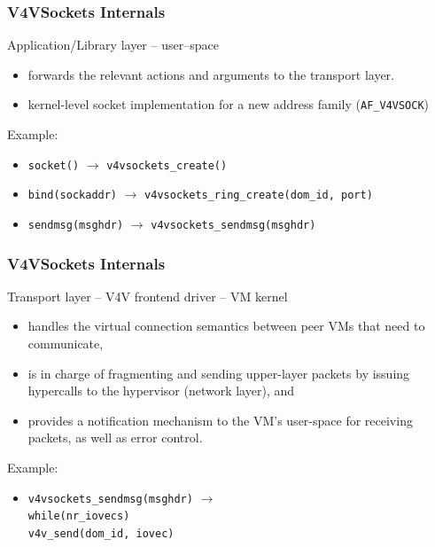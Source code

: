 \documentclass[red,slidestop,notes,compress,mathserif]{beamer}
\begin{document}
\begin{frame}
\frametitle{V4VSockets Internals}
\begin{block}{Application/Library layer -- user--space}
\begin{itemize}
\item forwards the relevant actions and arguments to the transport layer.
\item kernel-level socket implementation for a new address family (\texttt{AF\_V4VSOCK})
\end{itemize}
\end{block}
\begin{block}{Example:}
\begin{itemize}
\item \texttt{socket()} $\rightarrow$ \texttt{v4vsockets\_create()}
\item \texttt{bind(sockaddr)} $\rightarrow$ \texttt{v4vsockets\_ring\_create(dom\_id, port)}
\item \texttt{sendmsg(msghdr)} $\rightarrow$ \texttt{v4vsockets\_sendmsg(msghdr)}
\end{itemize}
\end{block}
\end{frame}

\begin{frame}
\frametitle{V4VSockets Internals}
\begin{block}{Transport layer -- V4V frontend driver -- VM kernel}
\begin{itemize}
\item handles the virtual connection semantics between peer VMs that need to communicate,
\item is in charge of fragmenting and sending upper-layer packets by issuing hypercalls to the hypervisor (network layer), and
\item provides a notification mechanism to the VM's user-space for receiving packets, as well as error control.
\end{itemize}
\end{block}
\begin{block}{Example:}
\begin{itemize}
\item \texttt{v4vsockets\_sendmsg(msghdr)} $\rightarrow$ \\\texttt{while(nr\_iovecs) \\    v4v\_send(dom\_id, iovec)}
\end{itemize}
\end{block}
\end{frame}
\end{document}
